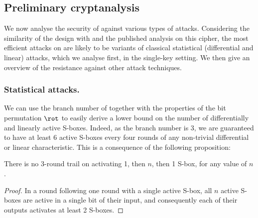 \subsection{Preliminary cryptanalysis}

We now analyse the security of \fly against various types of attacks. Considering the similarity of the design with \present and the published analysis on this cipher, the
most efficient attacks on \fly are likely to be variants of classical statistical (differential and linear) attacks, which we analyse first, in the single-key setting.
We then give an overview of the resistance against other attack techniques. 

\subsubsection{Statistical attacks.}
\label{sec:stats}
We can use the branch number of \littlunOne together with the properties of the bit permutation $\rot$ to easily derive a lower bound on the number of
differentially and linearly active S-boxes. Indeed, as the branch number is 3, we are guaranteed to have at least 6 active S-boxes
every four rounds of any non-trivial differential or linear characteristic. This is a consequence of the following proposition:
\begin{prop}
There is no 3-round trail on \fly activating 1, then $n$, then 1 S-box, for any value of $n$. 
\end{prop}
\begin{proof}
In a round following one round with a single active S-box, all $n$ active S-boxes are active in a single bit of their input, and consequently
each of their outputs activates at least 2 S-boxes.
\end{proof}

